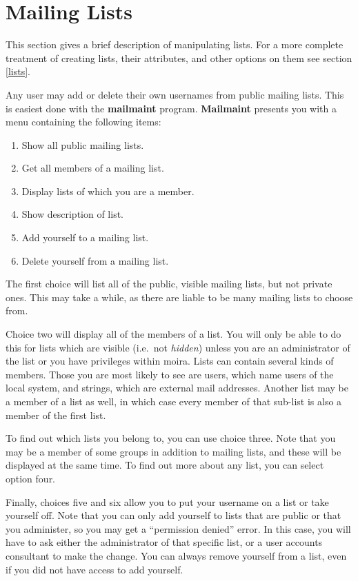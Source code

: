 \documentclass{book}
\begin{document}
\section{Mailing Lists}

This section gives a brief description of manipulating lists.  For a
more complete treatment of creating lists, their attributes, and other
options on them see section \ref{lists}.

Any user may add or delete their own usernames from public mailing lists.
This is easiest done with the {\bf mailmaint} program.  {\bf Mailmaint}
presents you with a menu containing the following items:
\begin{enumerate}
\item Show all public mailing lists.
\item Get all members of a mailing list.
\item Display lists of which you are a member.
\item Show description of list.
\item Add yourself to a mailing list.
\item Delete yourself from a mailing list.
\end{enumerate}
The first choice will list all of the public, visible mailing lists,
but not private ones.  This may take a while, as there are liable to
be many mailing lists to choose from.

Choice two will display all of the members of a list.  You will only
be able to do this for lists which are visible (i.e.\ not {\em hidden})
unless you are an administrator of the list or you have privileges
within moira.  Lists can contain several kinds of members.  Those you
are most likely to see are users, which name users of the local
system, and strings, which are external mail addresses.  Another list
may be a member of a list as well, in which case every member of that
sub-list is also a member of the first list.

To find out which lists you belong to, you can use choice three.  Note
that you may be a member of some groups in addition to mailing lists,
and these will be displayed at the same time.  To find out more about
any list, you can select option four.

Finally, choices five and six allow you to put your username on a list
or take yourself off.  Note that you can only add yourself to lists
that are public or that you administer, so you may get a ``permission
denied'' error.  In this case, you will have to ask either the
administrator of that specific list, or a user accounts consultant to
make the change.  You can always remove yourself from a list, even if
you did not have access to add yourself.
\end{document}
